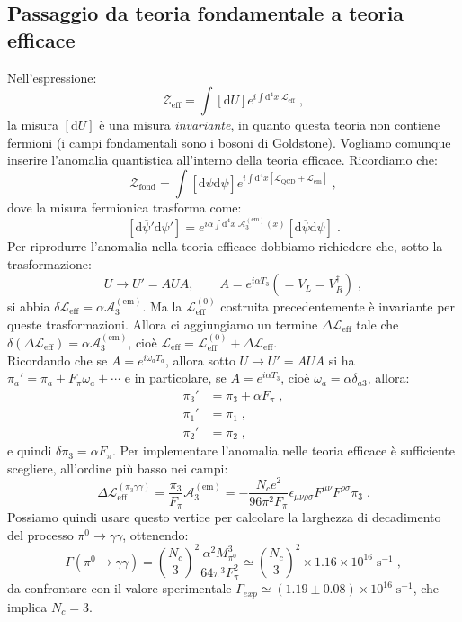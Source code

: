 \documentclass[12pt,a4paper]{article}
\theoremstyle{definition}
\newcommand{\lag}{\mathcal{L}}
\newcommand{\diff}[1][]{\mathrm{d}#1}
\newcommand{\adj}[1]{#1^{\dagger}}
\newcommand{\zpart}{\mathcal{Z}}
\numberwithin{equation}{section}
\begin{document}
\subsection{Passaggio da teoria fondamentale a teoria efficace}
Nell'espressione:
$$
\zpart_{\mathrm{eff}}=\int[\diff{U}]e^{i\int\diff^4{x}\;\lag_{\mathrm{eff}}}\;,
$$
la misura $[\diff{U}]$ è una misura \emph{invariante}, in quanto questa teoria non contiene fermioni (i campi fondamentali sono i bosoni di Goldstone). Vogliamo comunque inserire l'anomalia quantistica all'interno della teoria efficace. Ricordiamo che:
$$
\zpart_{\mathrm{fond}}=\int[\diff{\overline{\psi}}\diff{\psi}]e^{i\int\diff^4{x}[\lag_{\mathrm{QCD}}+\lag_{\mathrm{em}}]}\;,
$$
dove la misura fermionica trasforma come:
$$
[\diff{\overline{\psi}'}\diff{\psi}']=e^{i\alpha\int\diff^4{x}\;\mathcal{A}_3^{(\mathrm{em})}(x)}[\diff{\overline{\psi}}\diff{\psi}]\;.
$$
Per riprodurre l'anomalia nella teoria efficace dobbiamo richiedere che, sotto la trasformazione:
$$
U\to U'=AUA,\qquad A=e^{i\alpha T_3}(=V_L=\adj{V}_R)\;,
$$
si abbia $\delta\lag_{\mathrm{eff}}=\alpha\mathcal{A}_3^{(\mathrm{em})}$. Ma la $\lag_{\mathrm{eff}}^{(0)}$ costruita precedentemente è invariante per queste trasformazioni. Allora ci aggiungiamo un termine $\Delta\lag_{\mathrm{eff}}$ tale che $\delta(\Delta\lag_{\mathrm{eff}})=\alpha\mathcal{A}_3^{(\mathrm{em})}$, cioè $\lag_{\mathrm{eff}}=\lag_{\mathrm{eff}}^{(0)}+\Delta\lag_{\mathrm{eff}}$. \\
Ricordando che se $A=e^{i\omega_aT_a}$, allora sotto $U\to U'=AUA$ si ha $\pi_a'=\pi_a+F_{\pi}\omega_a+\cdots$ e in particolare, se $A=e^{i\alpha T_3}$, cioè $\omega_a=\alpha\delta_{a3}$, allora:
\begin{align*}
\pi_3'&=\pi_3+\alpha F_{\pi}\;, \\
\pi_1'&=\pi_1\;,  \\
\pi_2'&=\pi_2\;,
\end{align*}
e quindi $\delta\pi_3=\alpha F_{\pi}$. Per implementare l'anomalia nelle teoria efficace è sufficiente scegliere, all'ordine più basso nei campi:
\begin{equation}
\boxed{
\Delta\lag_{\mathrm{eff}}^{(\pi_3\gamma\gamma)}=\frac{\pi_3}{F_{\pi}}\mathcal{A}_3^{(\mathrm{em})}=-\frac{N_ce^2}{96\pi^2F_{\pi}}\epsilon_{\mu\nu\rho\sigma}F^{\mu\nu}F^{\rho\sigma}\pi_3
}\;.
\end{equation}
Possiamo quindi usare questo vertice per calcolare la larghezza di decadimento del processo $\pi^0\to \gamma\gamma$, ottenendo:
$$
\Gamma(\pi^0\to\gamma\gamma)=\left(\frac{N_c}{3}\right)^2\frac{\alpha^2M^3_{\pi^0}}{64\pi^3F_{\pi}^2}\simeq\left(\frac{N_c}{3}\right)^2\times 1.16\times 10^{16}\;\mathrm{s}^{-1}\;,
$$
da confrontare con il valore sperimentale $\Gamma_{exp}\simeq (1.19\pm 0.08)\times 10^{16}\;\mathrm{s}^{-1}$, che implica $N_c=3$.
\cleardoublepage
\end{document}
